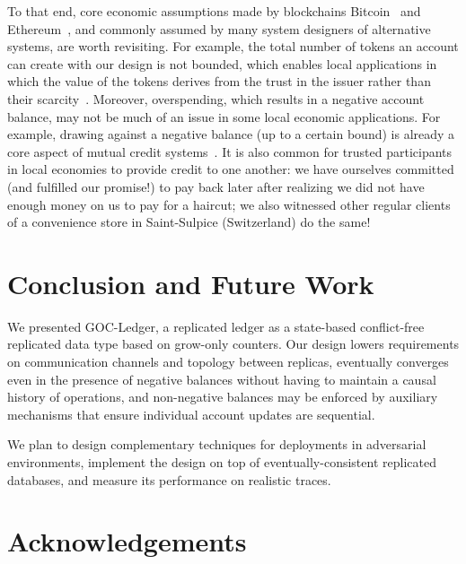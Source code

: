 \documentclass[9pt, oneside]{article}   	%
\begin{document}
To that end, core economic assumptions made by blockchains Bitcoin~\cite{nakamoto2008bitcoin} and Ethereum~\cite{buterin2014next}, and commonly assumed by many system designers of alternative systems, are worth revisiting. For example, the total number of tokens an account can create with our design is not bounded, which enables local applications in which the value of the tokens derives from the trust in the issuer rather than their scarcity~\cite{lavoie2022localcryptotokens}. Moreover, overspending, which results in a negative account balance, may not be much of an issue in some local economic applications. For example, drawing against a negative balance (up to a certain bound) is already a core aspect of mutual credit systems~\cite{schraven2001mutual}. It is also common for trusted participants in local economies to provide credit to one another: we have ourselves committed (and fulfilled our promise!) to pay back later after realizing we did not have enough money on us to pay for a haircut; we also witnessed other regular clients of a convenience store in Saint-Sulpice (Switzerland) do the same! 


\section{Conclusion and Future Work}
\label{sec:conclusion}

We presented GOC-Ledger, a replicated ledger as a state-based conflict-free replicated data type based on grow-only counters. Our design lowers requirements on communication channels and topology between replicas, eventually converges even in the presence of negative balances without having to maintain a causal history of operations, and non-negative balances may be enforced by auxiliary mechanisms that ensure individual account updates are sequential.

We plan to design complementary techniques for deployments in adversarial environments, implement the design on top of eventually-consistent replicated databases, and measure its performance on realistic traces.

\section{Acknowledgements}
\label{sec:acknowledgements}
\end{document}
